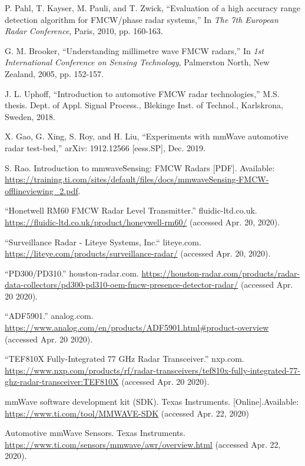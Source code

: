 \documentclass[11pt]{IEEEtran}
\begin{document}
\begin{thebibliography}{00}
				 P. Pahl, T. Kayser, M. Pauli, and T. Zwick, ``Evaluation of a high accuracy range detection algorithm for FMCW/phase radar systems,'' In \textit{The 7th European Radar Conference}, Paris, 2010, pp. 160-163.

				 G. M. Brooker, ``Understanding millimetre wave FMCW radars,'' In \textit{1st International Conference on Sensing Technology}, Palmerston North, New Zealand, 2005, pp. 152-157.

				 J. L. Uphoff, ``Introduction to automotive FMCW radar technologies,'' M.S. thesis. Dept. of Appl. Signal Process., Blekinge Inst. of Technol., Karlskrona, Sweden, 2018.

				 X. Gao, G. Xing, S. Roy, and H. Liu, ``Experiments with mmWave automotive radar test-bed,'' arXiv: 1912.12566 [eess.SP], Dec. 2019.
			
				 S. Rao. Introduction to mmwaveSensing: FMCW Radars [PDF]. Available: \url{https://training.ti.com/sites/default/files/docs/mmwaveSensing-FMCW-offlineviewing_2.pdf}.


				 ``Honetwell RM60 FMCW Radar Level Transmitter.'' fluidic-ltd.co.uk. \url{https://fluidic-ltd.co.uk/product/honeywell-rm60/} (accessed Apr. 20, 2020).

				 ``Surveillance Radar - Liteye Systems, Inc.`` liteye.com. \url{https://liteye.com/products/surveillance-radar/} (accessed Apr. 20, 2020).

				 ``PD300/PD310.'' houston-radar.com. \url{https://houston-radar.com/products/radar-data-collectors/pd300-pd310-oem-fmcw-presence-detector-radar/} (accessed Apr. 20 2020).

				 ``ADF5901.'' analog.com. \url{https://www.analog.com/en/products/ADF5901.html#product-overview} (accessed Apr. 20 2020).
				
				 ``TEF810X Fully-Integrated 77 GHz Radar Transceiver.'' nxp.com. \url{https://www.nxp.com/products/rf/radar-transceivers/tef810x-fully-integrated-77-ghz-radar-transceiver:TEF810X} (accessed Apr. 20 2020).

				 mmWave software development kit (SDK). Texas Instruments. [Online].Available: \url{https://www.ti.com/tool/MMWAVE-SDK} (accessed Apr. 22, 2020)

				 Automotive mmWave Sensors. Texas Instruments. \url{https://www.ti.com/sensors/mmwave/awr/overview.html} (accessed Apr. 22, 2020).


\end{thebibliography}
\end{document}
